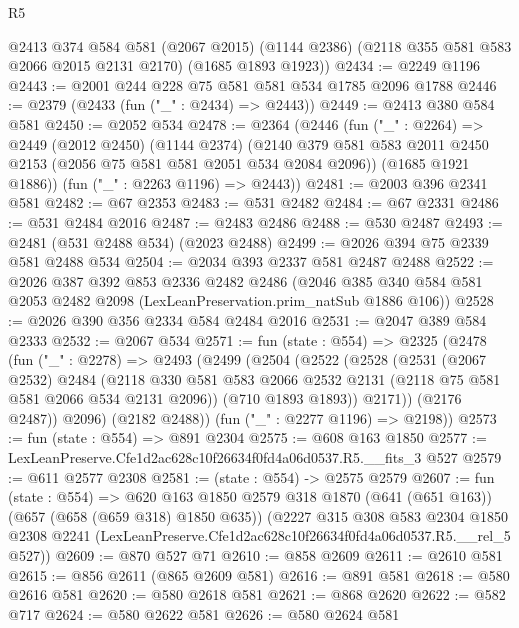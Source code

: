 \begin{lexlean}{R5}
\begin{coremodule}
    @2413
      @374
      @584
      @581
      (@2067 @2015)
      (@1144 @2386)
      (@2118 @355 @581 @583 @2066 @2015 @2131 @2170)
      (@1685 @1893 @1923))
@2434 := @2249 @1196
@2443 := @2001 @244 @228 @75 @581 @581 @534 @1785 @2096 @1788
@2446 := @2379 (@2433 (fun ("_" : @2434) => @2443))
@2449 := @2413 @380 @584 @581
@2450 := @2052 @534
@2478 := @2364
    (@2446
      (fun ("_" : @2264) =>
      @2449
        (@2012 @2450)
        (@1144 @2374)
        (@2140 @379 @581 @583 @2011 @2450 @2153 (@2056 @75 @581 @581 @2051 @534 @2084 @2096))
        (@1685 @1921 @1886))
      (fun ("_" : @2263 @1196) => @2443))
@2481 := @2003 @396 @2341 @581
@2482 := @67 @2353
@2483 := @531 @2482
@2484 := @67 @2331
@2486 := @531 @2484 @2016
@2487 := @2483 @2486
@2488 := @530 @2487
@2493 := @2481 (@531 @2488 @534) (@2023 @2488)
@2499 := @2026 @394 @75 @2339 @581 @2488 @534
@2504 := @2034 @393 @2337 @581 @2487 @2488
@2522 := @2026
    @387
    @392
    @853
    @2336
    @2482
    @2486
    (@2046 @385 @340 @584 @581 @2053 @2482 @2098 (LexLeanPreservation.prim_natSub @1886 @106))
@2528 := @2026 @390 @356 @2334 @584 @2484 @2016
@2531 := @2047 @389 @584 @2333
@2532 := @2067 @534
@2571 := fun (state : @554) =>
  @2325
    (@2478
      (fun ("_" : @2278) =>
      @2493
        (@2499
          (@2504
            (@2522
              (@2528
                (@2531
                  (@2067 @2532)
                  @2484
                  (@2118
                    @330
                    @581
                    @583
                    @2066
                    @2532
                    @2131
                    (@2118 @75 @581 @581 @2066 @534 @2131 @2096))
                  (@710 @1893 @1893))
                @2171))
            (@2176 @2487))
          @2096)
        (@2182 @2488))
      (fun ("_" : @2277 @1196) => @2198))
@2573 := fun (state : @554) => @891 @2304
@2575 := @608 @163 @1850
@2577 := LexLeanPreserve.Cfe1d2ac628c10f26634f0fd4a06d0537.R5.__fits_3 @527
@2579 := @611 @2577 @2308
@2581 := (state : @554) -> @2575 @2579
@2607 := fun (state : @554) =>
  @620
    @163
    @1850
    @2579
    @318
    @1870
    (@641 (@651 @163))
    (@657 (@658 (@659 @318) @1850 @635))
    (@2227
      @315
      @308
      @583
      @2304
      @1850
      @2308
      @2241
      (LexLeanPreserve.Cfe1d2ac628c10f26634f0fd4a06d0537.R5.__rel_5 @527))
@2609 := @870 @527 @71
@2610 := @858 @2609
@2611 := @2610 @581
@2615 := @856 @2611 (@865 @2609 @581)
@2616 := @891 @581
@2618 := @580 @2616 @581
@2620 := @580 @2618 @581
@2621 := @868 @2620
@2622 := @582 @717
@2624 := @580 @2622 @581
@2626 := @580 @2624 @581

\end{coremodule}
\end{lexlean}
